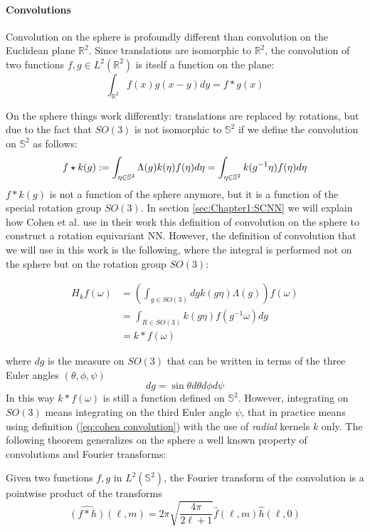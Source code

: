 \paragraph{Convolutions}
Convolution on the sphere is profoundly different than convolution on the Euclidean plane $\mathbb R^2$. Since translations are isomorphic to $\mathbb R^2$, the convolution of two functions $f, g \in L^2(\mathbb R^2)$ is itself a function on the plane:
$$ \int_{\mathbb R^2} f(x)g(x-y)dy = f*g(x)$$

On the sphere things work differently: translations are replaced by rotations, but due to the fact that $SO(3)$ is not isomorphic to $\mathbb S^2$ if we define the convolution on $\mathbb S^2$ as follows:
\begin{equation} \label{eq:cohen convolution}
f\star k(g) := \int_{\eta \in \mathbb S^2} \Lambda(g)k( \eta) f(\eta) d\eta=\int_{\eta \in \mathbb S^2} k(g^{-1} \eta) f(\eta) d\eta\\ 
\end{equation}
$f*k(g)$ is not a function of the sphere anymore, but it is a function of the special rotation group $SO(3)$. In section \ref{sec:Chapter1:SCNN} we will explain how Cohen et al. \cite{SCNN} use in their work this definition of convolution on the sphere to construct a rotation equivariant NN. However, the definition of convolution that we will use in this work is the following, where the integral is performed not on the sphere but on the rotation group $SO(3)$:

\begin{equation}\label{eq:convolution}
	\begin{aligned} H_{k} f(\omega) &=\left(\int_{g \in S O(3)} d g k(g \eta) \Lambda(g)\right) f(\omega) \\ &=\int_{R \in S O(3)} k(g \eta) f\left(g^{-1} \omega\right) d g \\ &=k * f(\omega) \end{aligned}
\end{equation}

where $dg$ is the measure on $SO(3)$ that can be written in terms of the three Euler angles $(\theta, \phi, \psi)$ 
$$dg=\sin\theta d\theta d\phi d\psi$$
In this way $k * f(\omega)$ is still a function defined on $\mathbb S^2$. However, integrating on $SO(3)$ means integrating on the third Euler angle $\psi$, that in practice means using definition (\ref{eq:cohen convolution}) with the use of \textit{radial} kernels $k$ only.
The following theorem generalizes on the sphere a well known property of convolutions and Fourier transforms: 
\vspace{0.5cm}
\begin{theorem}\label{theo:convolution}
	Given two functions $f, g$ in $L^2(\mathbb S^2)$, the Fourier transform of the convolution is a pointwise product of the transforms
$$
\hat{(f * h)}(\ell, m)=2 \pi \sqrt{\frac{4 \pi}{2 \ell+1}} \hat{f}(\ell, m) \hat{h}(\ell, 0)
$$
\end{theorem}
\vspace{0.5cm}

